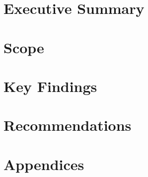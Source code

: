\tableofcontents
\newpage

\section{Executive Summary}
\lipsum[1]

\section{Scope}
\lipsum[2]

\section{Key Findings}
\lipsum[3]

\section{Recommendations}
\lipsum[4]

\section{Appendices}
\lipsum[5]

